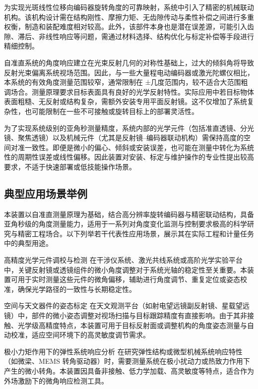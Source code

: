 为实现光斑线性位移向编码器旋转角度的可靠映射，系统中引入了精密的机械联动机构。该机构设计需在结构刚性、摩擦力矩、无齿隙传动与柔性补偿之间进行多重权衡，制造和装配难度相对较高。此外，该部件本身也是潜在误差源，可能引入齿隙、滞后、非线性响应等问题，需通过材料选择、结构优化与标定补偿等手段进行精细控制。

自准直系统的角度响应建立在光束反射几何的对称性基础上，过大的倾斜角将导致反射光束偏离系统视场范围。因此，与一些大量程电动编码器或激光陀螺仪相比，本系统的有效角度测量范围较窄，通常限制在 ±几度范围内，较不适合大范围粗调场合。测量原理要求目标表面具有良好的光学反射特性。实际应用中若目标物体表面粗糙、无反射或结构复杂，需额外安装专用平面反射镜。这不仅增加了系统复杂性，也可能限制在一些不可接触或旋转目标上的部署灵活性。

为了实现系统级别的亚角秒测量精度，系统内部的光学元件（包括准直透镜、分光镜、聚焦透镜）以及机械元件（尤其是反射镜–编码器联动机构）需保持高度的空间对准一致性。即便是微小的偏心、倾斜或安装误差，也可能在测量中转化为系统性的周期性误差或线性偏移。因此装置对安装、标定与维护操作的专业性提出较高要求，不适于快速部署或低技能操作场景。

\subsection{典型应用场景举例}

本装置以自准直测量原理为基础，结合高分辨率旋转编码器与精密联动结构，具备亚角秒级的角度测量能力，适用于一系列对角度变化监测与控制要求极高的科学研究与精密工程场合。以下列举若干代表性应用场景，展示其在实际工程和计量任务中的典型用途。

\begin{narrator}{高精度光学元件调校与检测}
	在干涉仪系统、激光共线系统或高阶光学实验平台中，关键反射镜或透镜组件的微小角度调整对于系统光轴的稳定性至关重要。本装置可用于实时测量这些元件的微角偏移，辅助进行角度调节、重复定位或姿态校准，确保光学路径的一致性与长期稳定性。
\end{narrator}

\begin{narrator}{空间与天文器件的姿态标定}
	在天文观测平台（如射电望远镜副反射镜、星载望远镜）中，部件的微小姿态调整对视场扫描与目标跟踪精度有直接影响。由于其非接触、光学级高精度特点，本装置可用于目标反射面或调整机构的角度姿态测量与自动校准，适应空间环境下的高灵敏度调节需求。
\end{narrator}

\begin{narrator}{极小力矩作用下的弹性系统响应分析}
	在研究弹性结构或微型机械系统响应特性（如微梁、MEMS 转角驱动器）时，需要测量系统在极小扰动力或热致力作用下产生的微小转角。本装置因具备非接触、低力学加载、高灵敏度等特点，适合作为外场激励下的微角响应检测工具。
\end{narrator}

